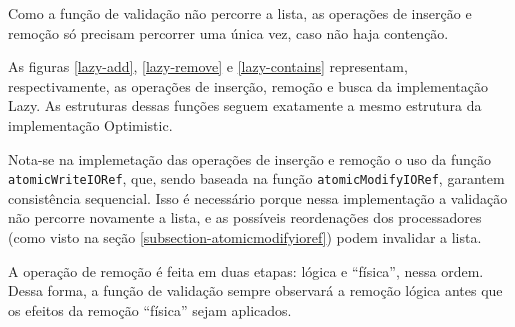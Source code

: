 \documentclass[a4paper,12pt,oldfontcommands]{abntex2}
\begin{document}
Como a função de validação não percorre a lista, as operações de inserção e remoção só precisam percorrer uma única vez, caso não haja contenção.

As figuras \ref{lazy-add}, \ref{lazy-remove} e \ref{lazy-contains} representam, respectivamente, as operações de inserção, remoção e busca da implementação Lazy. As estruturas dessas funções seguem exatamente a mesmo estrutura da implementação Optimistic.


Nota-se na implemetação das operações de inserção e remoção o uso da função \texttt{atomicWriteIORef}, que, sendo baseada na função \texttt{atomicModifyIORef}, garantem consistência sequencial. Isso é necessário porque nessa implementação a validação não percorre novamente a lista, e as possíveis reordenações dos processadores (como visto na seção \ref{subsection-atomicmodifyioref}) podem invalidar a lista.

A operação de remoção é feita em duas etapas: lógica e ``física'', nessa ordem. Dessa forma, a função de validação sempre observará a remoção lógica antes que os efeitos da remoção ``física'' sejam aplicados.
\end{document}
